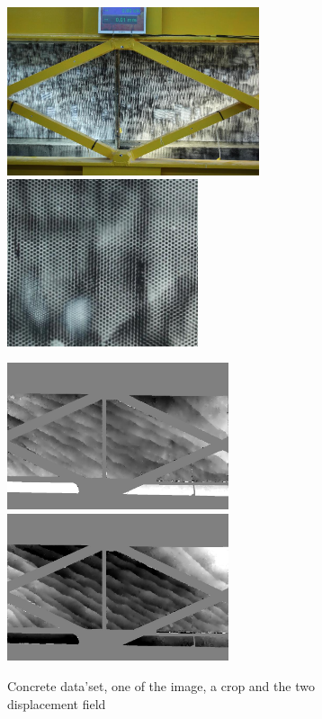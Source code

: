 \begin{figure}
\begin{center}
\includegraphics[width=74mm]{FIGS/Beton/IM1.jpg}
\includegraphics[width=56mm]{FIGS/Beton/IMCROP.jpg}

\includegraphics[width=65mm]{FIGS/Beton/Px1.jpg}
\includegraphics[width=65mm]{FIGS/Beton/Px2.jpg}

\end{center}
\caption{Concrete data'set, one of the image, a crop and the two displacement field}
\label{FIG:OK:Concrete}
\end{figure}


